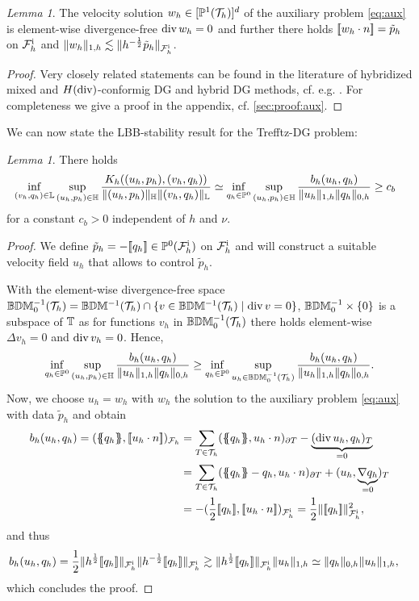 \documentclass[pdflatex,sn-mathphys,Numbered]{sn-jnl}%
\theoremstyle{remark}%
\newtheorem{lemma}[theorem]{Lemma}
\theoremstyle{definition}%
\begin{document}
\begin{lemma}\label{lem:aux} The velocity solution $w_h \in
  [\mathbb{P}^1({\mathcal{T}_h})]^d$ of the auxiliary problem \eqref{eq:aux} is
  element-wise divergence-free $\operatorname{\mathrm{div}} w_h = 0$ and further there holds
  $[\![w_h \cdot n]\!] = \tilde{p}_h$ on ${\mathcal{F}_h^{\text{i}}}$ and $\Vert w_h \Vert_{1,h}
  \lesssim \Vert h^{-\frac12}\tilde{p}_h \Vert_{{\mathcal{F}_h^{\text{i}}}}$.
\end{lemma}
\begin{proof}
  Very closely related statements can be found in the literature of hybridized mixed and $H(\operatorname{\mathrm{div}})$-conformig DG and hybrid DG methods, cf. e.g. \cite{cockburn2005locally,cockburn2007note}. For completeness we give a proof in the appendix, cf. \cref{sec:proof:aux}.
\end{proof}

We can now state the LBB-stability result for the Trefftz-DG problem:
\begin{lemma}\label{lem:LBB}
  There holds
  \begin{align*}
    &  \inf_{(v_h,q_h) \in \mathbb{L}} \sup_{(u_h,p_h) \in \mathbb{H}} \frac{K_h((u_h,p_h),(v_h,q_h))}{\Vert (u_h,p_h) \Vert_{\mathbb{H}} \Vert (v_h,q_h) \Vert_{\mathbb{L}}}  \simeq
    \inf_{q_h \in \mathbb{P}^0} \sup_{(u_h,p_h) \in \mathbb{H}} \frac{b_h(u_h,q_h)}{\Vert u_h \Vert_{1,h} \Vert q_h \Vert_{0,h}}
    \geq c_b
  \end{align*}
  for a constant $c_b > 0$ independent of $h$ and $\nu$.
\end{lemma}
\begin{proof}
  We define $\tilde{p}_h = -[\![q_h]\!] \in \mathbb{P}^0({\mathcal{F}_h^{\text{i}}})$ on ${\mathcal{F}_h^{\text{i}}}$ and will construct a suitable velocity field $u_h$ that allows to control $\tilde{p}_h$.

  With the element-wise divergence-free space $\mathbb{B}\mathbb{D}\mathbb{M}^{-1}_0({\mathcal{T}_h}) =
  \mathbb{B}\mathbb{D}\mathbb{M}^{-1}({\mathcal{T}_h}) \cap \{v \in \mathbb{B}\mathbb{D}\mathbb{M}^{-1}({\mathcal{T}_h}) \mid \operatorname{\mathrm{div}} v = 0\}$,
  $\mathbb{B}\mathbb{D}\mathbb{M}^{-1}_0 \times \{0\}$ is a subspace of $\mathbb{T}$ as for functions
  $v_h$ in $\mathbb{B}\mathbb{D}\mathbb{M}^{-1}_0({\mathcal{T}_h})$ there holds element-wise $\Delta v_h =
  0$ and $\operatorname{\mathrm{div}} v_h = 0 $. Hence,  
  $$
  \inf_{q_h \in \mathbb{P}^0} \sup_{(u_h,p_h) \in \mathbb{H}} \frac{b_h(u_h,q_h)}{\Vert u_h \Vert_{1,h} \Vert q_h \Vert_{0,h}}
  \geq \inf_{q_h \in \mathbb{P}^0} \sup_{u_h \in \mathbb{B}\mathbb{D}\mathbb{M}^{-1}_0({\mathcal{T}_h})} \frac{b_h(u_h,q_h)}{\Vert u_h \Vert_{1,h} \Vert q_h \Vert_{0,h}}.
  $$
  Now, we choose $u_h=w_h$ with $w_h$ the solution to the auxiliary problem \eqref{eq:aux} with data $\tilde{p}_h$ and obtain
  \begin{align*}
    b_h(u_h,q_h)  = (\avg{q_h}, \jmp{u_h \cdot n})_{\Fh}  
    &=
    \sum_{T\in\Th} (\avg{q_h}, u_h \cdot n)_{\partial T} - \underbrace{(\Div u_h, q_h)_T}_{=0} \\
    & =\sum_{T\in\Th} (\avg{q_h}-q_h, u_h \cdot n)_{\partial T} + ( u_h, \underbrace{ \nabla q_h}_{=0})_T  \\
    &= -(\frac12 \jmp{q_h}, \jmp{u_h \cdot n})_{\Fhi} = \frac12 \nrm{\jmp{q_h}}_{\Fhi}^2,
  \end{align*}
  and thus 
  \begin{align*}
    b_h(u_h,q_h) & = \frac12 \Vert h^{\frac12}[\![q_h]\!] \Vert_{{\mathcal{F}_h^{\text{i}}}} \Vert h^{-\frac12}[\![q_h]\!] \Vert_{{\mathcal{F}_h^{\text{i}}}} \gtrsim \Vert h^{\frac12}[\![q_h]\!] \Vert_{{\mathcal{F}_h^{\text{i}}}} \Vert u_h \Vert_{1,h} \simeq \Vert q_h \Vert_{0,h} \Vert u_h \Vert_{1,h},
  \end{align*}
  which concludes the proof.
\end{proof}
\end{document}
